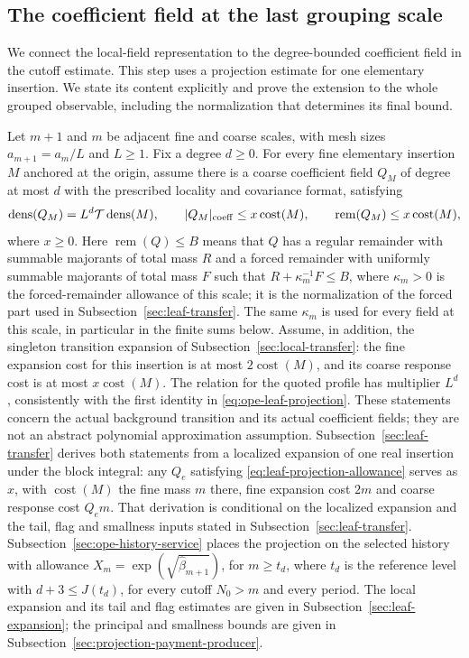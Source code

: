 \subsection{The coefficient field at the last grouping scale}
\label{sec:ope-local-projection}
We connect the local-field representation to the degree-bounded
coefficient field in the cutoff estimate. This step uses a projection
estimate for one elementary insertion. We state its content explicitly
and prove the extension to the whole grouped observable, including
the normalization that determines its final bound.

Let $m+1$ and $m$ be adjacent fine and coarse scales, with mesh
sizes $a_{m+1}=a_m/L$ and $L\ge1$. Fix a degree $d\ge0$.
For every fine elementary insertion $M$ anchored at the origin,
assume there is a coarse coefficient field $Q_M$ of degree at most
$d$ with the prescribed locality and covariance format, satisfying
\begin{equation}\label{eq:ope-leaf-projection}
 \operatorname{dens}(Q_M)=L^d\mathcal T\operatorname{dens}(M),
 \qquad |Q_M|_{\rm coeff}\le x\operatorname{cost}(M),
 \qquad \operatorname{rem}(Q_M)\le x\operatorname{cost}(M),
\end{equation}
where $x\ge0$. Here $\operatorname{rem}(Q)\le B$ means that $Q$ has
a regular remainder with summable majorants of total mass $R$ and a forced
remainder with uniformly summable majorants of total mass $F$ such that
$R+\kappa_m^{-1}F\le B$, where $\kappa_m>0$ is the forced-remainder
allowance of this scale; it is the normalization of the forced part used
in Subsection~\ref{sec:leaf-transfer}. The same $\kappa_m$ is used for
every field at this scale, in particular in the finite sums below. Assume, in addition, the singleton transition
expansion of Subsection~\ref{sec:local-transfer}: the fine expansion
cost for this insertion is at most $2\operatorname{cost}(M)$,
and its coarse response cost is at most
$x\operatorname{cost}(M)$. The relation for the quoted profile
has multiplier $L^d$, consistently with the first identity in
\eqref{eq:ope-leaf-projection}. These statements concern the
actual background transition and its actual coefficient fields;
they are not an abstract polynomial approximation assumption.
Subsection~\ref{sec:leaf-transfer} derives both statements from a localized
expansion of one real insertion under the block integral: any $Q_e$
satisfying \eqref{eq:leaf-projection-allowance} serves as $x$, with
$\operatorname{cost}(M)$ the fine mass $m$ there, fine expansion cost
$2m$ and coarse response cost $Q_em$. That derivation is conditional on
the localized expansion and the tail, flag and smallness inputs stated
in Subsection~\ref{sec:leaf-transfer}.
Subsection~\ref{sec:ope-history-service} places the projection on the
selected history with allowance $X_m=\exp(\sqrt{\widehat\beta_{m+1}})$,
for $m\ge t_d$, where $t_d$ is the reference level with $d+3\le J(t_d)$,
for every cutoff $N_0>m$ and every period.
The local expansion and its tail and flag estimates are given in
Subsection~\ref{sec:leaf-expansion}; the principal and smallness bounds
are given in Subsection~\ref{sec:projection-payment-producer}.

